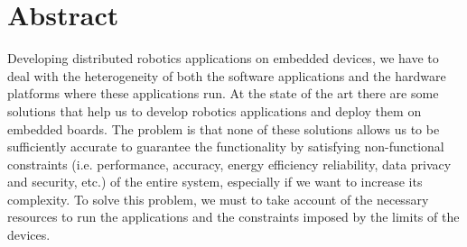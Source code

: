 \chapter{Abstract}
Developing distributed robotics applications on embedded devices, we have to deal with the heterogeneity of both the software applications and the hardware platforms where these applications run.
At the state of the art there are some solutions that help us to develop robotics applications and deploy them on embedded boards. 
The problem is that none of these solutions allows us to be sufficiently accurate to guarantee the functionality by satisfying non-functional constraints (i.e. performance, accuracy, energy efficiency reliability, data privacy and security, etc.) of the entire system, especially if we want to increase its complexity.
To solve this problem, we must to take account of the necessary resources to run the applications and the constraints imposed by the limits of the devices.


\clearpage
\thispagestyle{empty}